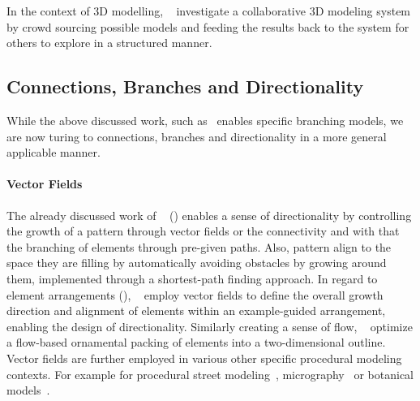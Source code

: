 In the context of 3D modelling, \citeauthor*{talton_2009_emw}~\cite{talton_2009_emw} investigate a collaborative 3D modeling system by crowd sourcing possible models and feeding the results back to the system for others to explore in a structured manner. 




\subsection{Connections, Branches and Directionality}
\label{subsec:analysis_connections_branches_and_directionality}


While the above discussed work, such as~\cite{yu_2012_ans,xu_2009_mcc, merrell_2010_ecs}  enables specific branching models, we are now turing to connections, branches and directionality in a more general applicable manner.

\paragraph*{Vector Fields}
The already discussed work of \citeauthor*{gieseke_2017_ooo}~\cite{gieseke_2017_ooo} () enables a sense of directionality by controlling the growth of a pattern through vector fields or the connectivity and with that the branching of elements through pre-given paths. Also, pattern align to the space they are filling by automatically avoiding obstacles by growing around them, implemented through a shortest-path finding approach. In regard to element arrangements (), \citeauthor*{ijiri_2008_aeb}~\cite{ijiri_2008_aeb} employ vector fields to define the overall growth direction and alignment of elements within an example-guided arrangement, enabling the design of directionality. Similarly creating a sense of flow, \citeauthor*{saputra_2017_ffo}~\cite{saputra_2017_ffo} optimize a flow-based ornamental packing of elements into a two-dimensional outline. Vector fields are further employed in various other specific procedural modeling contexts. For example for procedural street modeling~\cite{chen_2008_ips}, micrography~\cite{maharik_2011_dm} or botanical models~\cite{xu_2015_ptm}.

